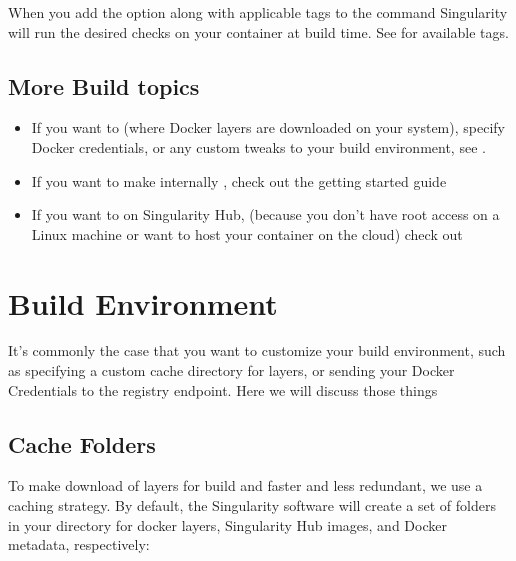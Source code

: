 \documentclass[letterpaper,10pt,english]{sphinxmanual}
\begin{document}
When you add the  option along with applicable tags to the  command
Singularity will run the desired checks on your container at build time.
See  for available tags.


\section{More Build topics}
\label{\detokenize{build_a_container:more-build-topics}}\begin{itemize}
\item {} 
If you want to  (where Docker layers
are downloaded on your system), specify Docker credentials, or any
custom tweaks to your build environment, see {\hyperref[\detokenize{build_environment:build-environment}]{}}.

\item {} 
If you want to make internally , check out the
getting started guide 

\item {} 
If you want to  on Singularity Hub, (because
you don’t have root access on a Linux machine or want to host your
container on the cloud) check out 

\end{itemize}


\chapter{Build Environment}
\label{\detokenize{build_environment:build-environment}}\label{\detokenize{build_environment:id1}}\label{\detokenize{build_environment::doc}}\label{\detokenize{build_environment:sec-buildenv}}
It’s commonly the case that you want to customize your build
environment, such as specifying a custom cache directory for layers, or
sending your Docker Credentials to the registry endpoint. Here we will
discuss those things


\section{Cache Folders}
\label{\detokenize{build_environment:cache-folders}}
To make download of layers for build and {\hyperref[\detokenize{appendix:pull-command}]{}} faster and less redundant, we
use a caching strategy. By default, the Singularity software will create
a set of folders in your  directory for docker layers, Singularity Hub
images, and Docker metadata, respectively:
\end{document}
